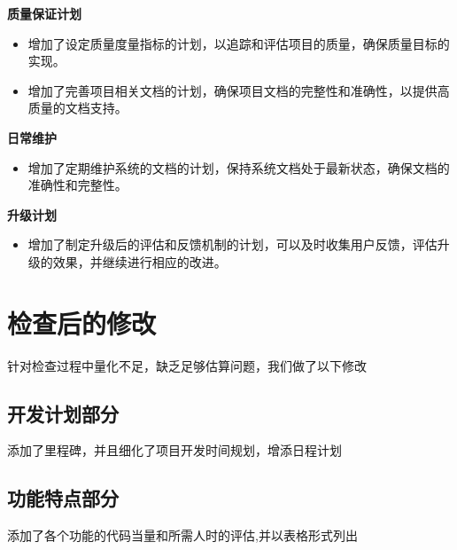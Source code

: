 \documentclass{article}
\begin{document}
\textbf{质量保证计划}
\begin{itemize}
	\item 增加了设定质量度量指标的计划，以追踪和评估项目的质量，确保质量目标的实现。
	\item 增加了完善项目相关文档的计划，确保项目文档的完整性和准确性，以提供高质量的文档支持。
\end{itemize}

\textbf{日常维护}
\begin{itemize}
	\item 增加了定期维护系统的文档的计划，保持系统文档处于最新状态，确保文档的准确性和完整性。
\end{itemize}

\textbf{升级计划}
\begin{itemize}
	\item 增加了制定升级后的评估和反馈机制的计划，可以及时收集用户反馈，评估升级的效果，并继续进行相应的改进。
\end{itemize}


\section{检查后的修改}
针对检查过程中量化不足，缺乏足够估算问题，我们做了以下修改
\subsection{开发计划部分}
添加了里程碑，并且细化了项目开发时间规划，增添日程计划
\subsection{功能特点部分}
添加了各个功能的代码当量和所需人时的评估,并以表格形式列出
\end{document}
